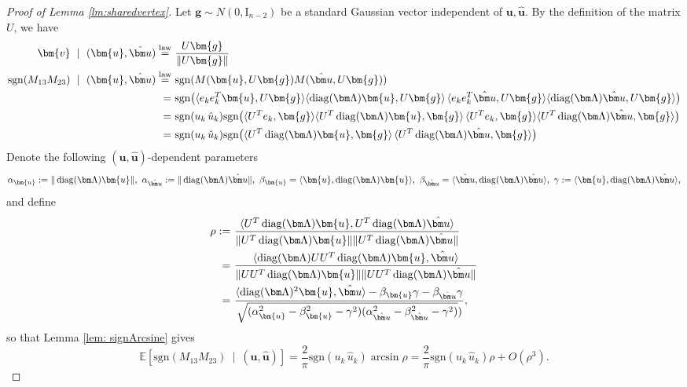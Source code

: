 \documentclass[reqno]{amsart}
\numberwithin{equation}{section}
\newcommand\E{\mathbb{E}}
\newcommand\R{\mathbb{R}}
\newcommand\bg{\bm{g}}
\newcommand\bu{\bm{u}}
\newcommand\hu{\hat{\bm u}}
\newcommand\bv{\bm{v}}
\newcommand{\diag}{\mathop {\rm diag}}
\begin{document}
\begin{proof}[Proof of Lemma \ref{lm:sharedvertex}]
Let $\bg\sim N(0,\mathrm{I}_{n-2})$ be a standard Gaussian vector independent of $\bu,\hu$. By the definition of the matrix $U$, we have 
\begin{align*}
    \bv\ \mid\ (\bu,\hu) \stackrel{\mathrm{law}}{=}&\ \frac{U\bg}{\|U\bg\|}\\
    \mathrm{sgn}(M_{13}M_{23})\ \mid\ (\bu,\hu)
  \stackrel{\mathrm{law}}{=}&\ \mathrm{sgn}(M(\bu,U\bg)M(\hu,U\bg))\\
 =&\ \mathrm{sgn}\big(\langle e_{k}e_{k}^{T}\bu,U\bg\rangle\langle\diag(\bm\Lambda)\bu,U\bg\rangle\,\langle e_{k}e_{k}^{T}\hu,U\bg\rangle\langle\diag(\bm\Lambda)\hu,U\bg\rangle\big)
 \\
 =&\ \mathrm{sgn}(u_k\,\hat{u}_k)\mathrm{sgn}\big(\langle U^{T}e_{k},\bg\rangle\langle U^T\diag(\bm\Lambda)\bu,\bg\rangle\,\langle U^Te_{k},\bg\rangle\langle U^T\diag(\bm\Lambda)\hu,\bg\rangle\big)
 \\
 =&\ \mathrm{sgn}(u_k\,\hat{u}_k)\mathrm{sgn}\big(\langle U^T\diag(\bm\Lambda)\bu,\bg\rangle\,\langle U^T\diag(\bm\Lambda)\hu,\bg\rangle\big)
\end{align*}
Denote the following $(\bu,\hu)$-dependent parameters $$\alpha_{\bu}:=\|\diag(\bm\Lambda)\bu\|,\ \alpha_{\hu}:=\|\diag(\bm\Lambda)\hu\|,\ \beta_{\bu}=\langle\bu,\diag(\bm\Lambda)\bu\rangle,\ \beta_{\hu}=\langle\hu,\diag(\bm\Lambda)\hu\rangle,\ \gamma:=\langle\bu,\diag(\bm\Lambda)\hu\rangle,$$ and define \begin{align*}
\rho:= &\ \frac{\langle U^T\diag(\bm\Lambda)\bu,U^T\diag(\bm\Lambda)\hu\rangle}{\|U^T\diag(\bm\Lambda)\bu\|\|U^T\diag(\bm\Lambda)\hu\|}\\= &\ \frac{\langle \diag(\bm\Lambda)UU^T\diag(\bm\Lambda)\bu,\hu\rangle}{\|UU^T\diag(\bm\Lambda)\bu\|\|UU^T\diag(\bm\Lambda)\hu\|}\\= &\ \frac{\langle \diag(\bm\Lambda)^2\bu,\hu\rangle-\beta_{\bu}\gamma-\beta_{\hu}\gamma}{\sqrt{(\alpha_{\bu}^2-\beta_{\bu}^2-\gamma^2)(\alpha_{\hu}^2-\beta_{\hu}^2-\gamma^2)})},
\end{align*} so that Lemma \ref{lem: signArcsine} gives
\[\E\left[\mathrm{sgn}(M_{13}M_{23})\ \mid\ (\bu,\hu)\right]=\frac{2}{\pi}\mathrm{sgn}(u_k\,\hat{u}_k)\arcsin{\rho}=\frac{2}{\pi}\mathrm{sgn}(u_k\,\hat{u}_k)\rho+O(\rho^3).\]

\end{proof}
\end{document}
